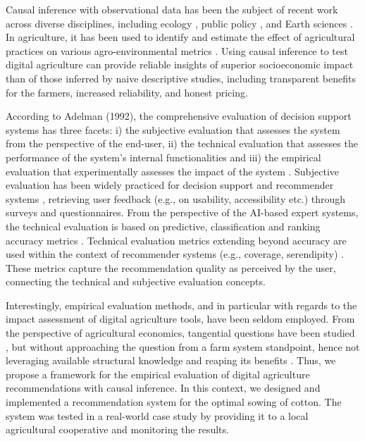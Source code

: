 \documentclass[letterpaper]{article} %
\begin{document}
Causal inference with observational data has been the subject of recent work across diverse disciplines, including 
ecology \cite{arif2022utilizing}, public policy \cite{fougere2019causal}, and Earth sciences
\cite{massmann2021causal, runge2019inferring}. In agriculture, it has been used to identify and estimate the effect of agricultural practices on various agro-environmental metrics \cite{qian2016applying, deines2019satellites, giannarakis2022personalizing, giannarakis2022towards}.
Using causal inference to test digital agriculture can provide reliable insights of superior socioeconomic impact than of those inferred by naive descriptive studies, including transparent benefits for the farmers, increased reliability, and honest pricing. 


According to Adelman (1992), the comprehensive evaluation of decision support systems has three facets: i) the subjective evaluation that assesses the system from the perspective of the end-user, ii) the technical evaluation that assesses the performance of the system's internal functionalities and iii) the empirical evaluation that experimentally assesses the impact of the system \cite{adelman1992evaluating}. Subjective evaluation has been widely practiced for decision support  \cite{zhai2020decision}  and recommender systems \cite{pu2012evaluating}, retrieving user feedback (e.g., on usability, accessibility etc.) through surveys and questionnaires. From the perspective of the AI-based expert systems, the technical evaluation is based on predictive, classification and ranking accuracy metrics \cite{schroder2011setting}. Technical evaluation metrics extending beyond accuracy are used within the context of recommender systems (e.g., coverage, serendipity) \cite{ge2010beyond}. These metrics capture the recommendation quality as perceived by the user, connecting the technical and subjective evaluation concepts.

Interestingly, empirical evaluation methods, and in particular with regards to the impact assessment of digital agriculture tools, have been seldom employed. 
From the perspective of agricultural economics, tangential questions have been studied \cite{muller1974sources, roberts2009estimating, schimmelpfennig2016sequential, mcfadden2022information}, but without approaching the question from a farm system standpoint, hence not leveraging available structural knowledge and reaping its benefits \cite{cinelli_crash_2020}.
Thus, we propose a framework for the empirical evaluation of digital agriculture recommendations with causal inference.
In this context, we designed and implemented a recommendation system for the optimal sowing of cotton. The system was tested in a real-world case study by providing it to a local agricultural cooperative and monitoring the results.
\end{document}
